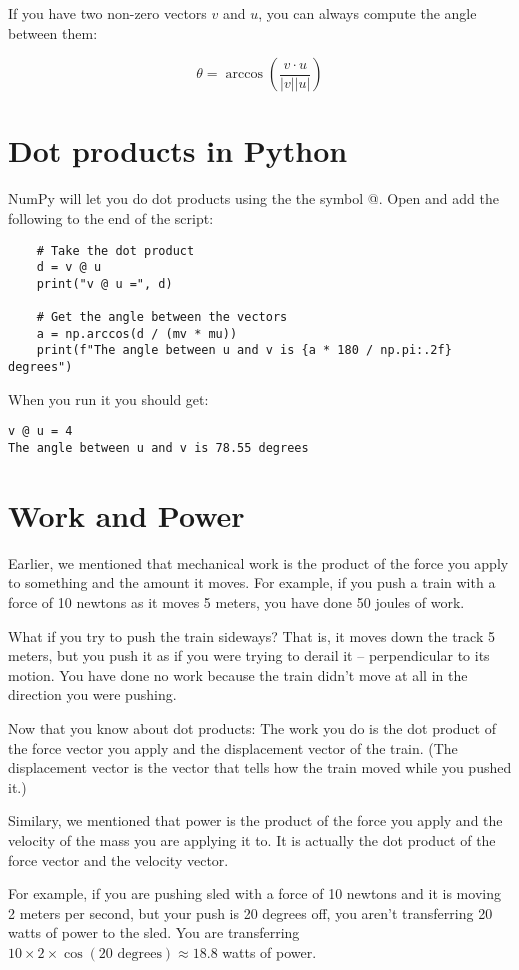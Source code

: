 If you have two non-zero vectors $v$ and $u$, you can always compute the angle between them:

$$\theta = \arccos(\frac{v \cdot u}{|v| |u|})$$
\section{Dot products in Python}

NumPy will let you do dot products using the the symbol @.  Open  
and add the following to the end of the script:

\begin{Verbatim}
    # Take the dot product
    d = v @ u
    print("v @ u =", d)
    
    # Get the angle between the vectors
    a = np.arccos(d / (mv * mu))
    print(f"The angle between u and v is {a * 180 / np.pi:.2f} degrees")    
\end{Verbatim}

When you run it you should get:
\begin{Verbatim}
v @ u = 4
The angle between u and v is 78.55 degrees
\end{Verbatim}

\section{Work and Power}
Earlier, we mentioned that mechanical work is the product of the 
force you apply to something and the amount it moves. For example, if you 
push a train with a force of 10 newtons as it moves 5 meters, you have done 50 joules of work.

What if you try to push the train sideways? That is, it moves down the track 5 meters, 
but you push it as if you were trying to derail it -- perpendicular to its motion.  
You have done no work because the train didn't move at all in the direction you were pushing.

Now that you know about dot products: The work you do is the dot
product of the force vector you apply and the displacement vector of the train. (The displacement
vector is the vector that tells how the train moved while you pushed it.) 

Similary, we mentioned that power is the product of the force you apply and the velocity of the
mass you are applying it to. It is actually the dot product of the force vector and the velocity vector.

For example, if you are pushing sled with a force of 10 newtons and it is moving 2 meters per second, 
but your push is 20 degrees off, you aren't transferring 20 watts of power to the sled.  
You are transferring $10 \times 2 \times \cos(20 \text{ degrees}) \approx 18.8$ watts of power.
